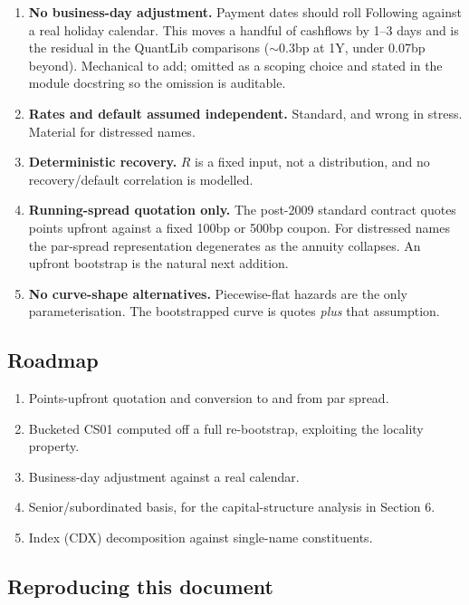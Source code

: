 \documentclass[11pt,a4paper]{article}
\begin{document}
\begin{enumerate}[leftmargin=1.4em,itemsep=0.3em]
\item \textbf{No business-day adjustment.} Payment dates should roll Following against a real
holiday calendar. This moves a handful of cashflows by 1--3 days and is the residual in the
QuantLib comparisons ($\sim$0.3bp at 1Y, under 0.07bp beyond). Mechanical to add; omitted as a
scoping choice and stated in the module docstring so the omission is auditable.

\item \textbf{Rates and default assumed independent.} Standard, and wrong in stress. Material
for distressed names.

\item \textbf{Deterministic recovery.} $R$ is a fixed input, not a distribution, and no
recovery/default correlation is modelled.

\item \textbf{Running-spread quotation only.} The post-2009 standard contract quotes points
upfront against a fixed 100bp or 500bp coupon. For distressed names the par-spread
representation degenerates as the annuity collapses. An upfront bootstrap is the natural next
addition.

\item \textbf{No curve-shape alternatives.} Piecewise-flat hazards are the only
parameterisation. The bootstrapped curve is quotes \emph{plus} that assumption.
\end{enumerate}

\subsection{Roadmap}

\begin{enumerate}[leftmargin=1.4em,itemsep=0.2em]
\item Points-upfront quotation and conversion to and from par spread.
\item Bucketed CS01 computed off a full re-bootstrap, exploiting the locality property.
\item Business-day adjustment against a real calendar.
\item Senior/subordinated basis, for the capital-structure analysis in Section 6.
\item Index (CDX) decomposition against single-name constituents.
\end{enumerate}

\subsection{Reproducing this document}
\end{document}
